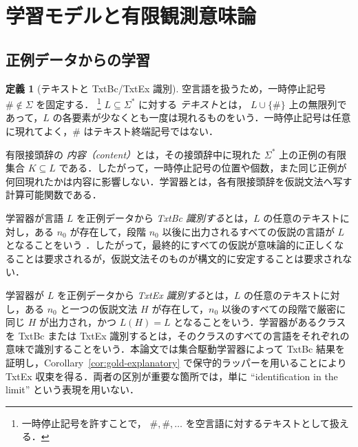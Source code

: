 \documentclass[11pt,a4paper]{ltjsarticle}
\numberwithin{equation}{section}
\theoremstyle{plain}
\theoremstyle{definition}
\newtheorem{definition}[theorem]{定義}
\theoremstyle{remark}
\begin{document}
\section{学習モデルと有限観測意味論}
\label{sec:prelim}

\subsection{正例データからの学習}

\begin{definition}[テキストと TxtBc/TxtEx 識別]
空言語を扱うため，一時停止記号
\(\#\notin\Sigma\) を固定する．%
\footnote{一時停止記号を許すことで，
\(\#,\#,\ldots\) を空言語に対するテキストとして扱える．}
\(L\subseteq\Sigma^*\) に対する \emph{テキスト}とは，
\(L\cup\{\#\}\) 上の無限列であって，$L$ の各要素が少なくとも一度は現れるものをいう．一時停止記号は任意に現れてよく，$\#$ はテキスト終端記号ではない．

有限接頭辞の \emph{内容（content）}とは，その接頭辞中に現れた $\Sigma^*$ 上の正例の有限集合 $K\subseteq L$ である．したがって，一時停止記号の位置や個数，また同じ正例が何回現れたかは内容に影響しない．学習器とは，各有限接頭辞を仮説文法へ写す計算可能関数である．

学習器が言語 $L$ を正例データから \emph{TxtBc 識別する}とは，$L$ の任意のテキストに対し，ある $n_0$ が存在して，段階 $n_0$ 以後に出力されるすべての仮説の言語が $L$ となることをいう
\cite{CaseLynes1982,CaseSmith1983}．したがって，最終的にすべての仮説が意味論的に正しくなることは要求されるが，仮説文法そのものが構文的に安定することは要求されない．

学習器が $L$ を正例データから \emph{TxtEx 識別する}とは，$L$ の任意のテキストに対し，ある $n_0$ と一つの仮説文法 $H$ が存在して，$n_0$ 以後のすべての段階で厳密に同じ $H$ が出力され，かつ $L(H)=L$ となることをいう．学習器があるクラスを TxtBc または TxtEx 識別するとは，そのクラスのすべての言語をそれぞれの意味で識別することをいう．本論文では集合駆動学習器によって TxtBc 結果を証明し，Corollary~\ref{cor:gold-explanatory} で保守的ラッパーを用いることにより TxtEx 収束を得る．両者の区別が重要な箇所では，単に ``identification in the limit'' という表現を用いない．
\end{definition}
\end{document}
